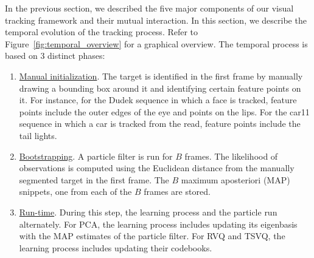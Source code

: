 In the previous section, we described the five major components of our visual tracking framework and their mutual interaction.  In this section, we describe the temporal evolution of the tracking process.  Refer to Figure~\ref{fig:temporal_overview} for a graphical overview.  The temporal process is based on 3 distinct phases:

\begin{enumerate}
\item \underline{Manual initialization}.  The target is identified in the first frame by manually drawing a bounding box around it and identifying certain feature points on it.  For instance, for the Dudek sequence in which a face is tracked, feature points include the outer edges of the eye and points on the lips.  For the car11 sequence in which a car is tracked from the read, feature points include the tail lights.


\item \underline{Bootstrapping}.  A particle filter is run for $B$ frames.  The likelihood of observations is computed using the Euclidean distance from the manually segmented target in the first frame.  The $B$ maximum aposteriori (MAP) snippets, one from each of the $B$ frames are stored.

\item \underline{Run-time}.  During this step, the learning process and the particle run alternately.  For PCA, the learning process includes updating its eigenbasis with the MAP estimates of the particle filter.  For RVQ and TSVQ, the learning process includes updating their codebooks. 
\end{enumerate}



